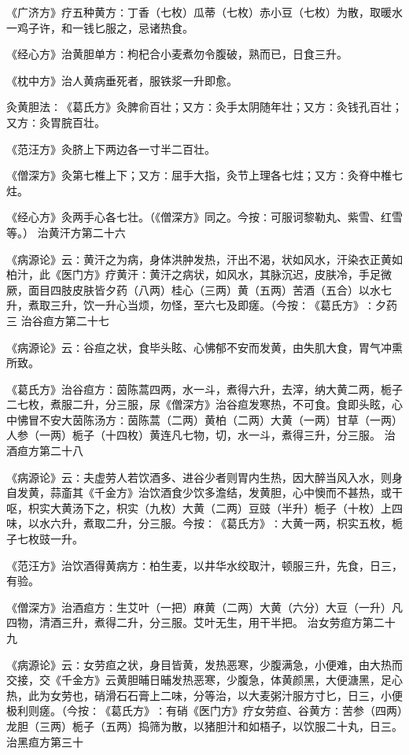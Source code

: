 \documentclass[a4paper,12pt,UTF8,twoside]{ctexbook}
\begin{document}
《广济方》疗五种黄方∶丁香（七枚）瓜蒂（七枚）赤小豆（七枚）为散，取暖水一鸡子许，和一钱匕服之，忌诸热食。

《经心方》治黄胆单方∶枸杞合小麦煮勿令腹破，熟而已，日食三升。

《枕中方》治人黄病垂死者，服铁浆一升即愈。

灸黄胆法∶《葛氏方》灸脾俞百壮；又方∶灸手太阴随年壮；又方∶灸钱孔百壮；又方∶灸胃脘百壮。

《范汪方》灸脐上下两边各一寸半二百壮。

《僧深方》灸第七椎上下；又方∶屈手大指，灸节上理各七炷；又方∶灸脊中椎七炷。

《经心方》灸两手心各七壮。（《僧深方》同之。今按∶可服诃黎勒丸、紫雪、红雪等。）
治黄汗方第二十六

《病源论》云∶黄汗之为病，身体洪肿发热，汗出不渴，状如风水，汗染衣正黄如柏汁，此《医门方》疗黄汗∶黄汗之病状，如风水，其脉沉迟，皮肤冷，手足微厥，面目四肢皮肤皆夕药（八两）桂心（三两）黄（五两）苦酒（五合）以水七升，煮取三升，饮一升心当烦，勿怪，至六七及即瘥。（今按∶《葛氏方》∶夕药三
治谷疸方第二十七

《病源论》云∶谷疸之状，食毕头眩、心怫郁不安而发黄，由失肌大食，胃气冲熏所致。

《葛氏方》治谷疸方∶茵陈蒿四两，水一斗，煮得六升，去滓，纳大黄二两，栀子二七枚，煮服二升，分三服，尿《僧深方》治谷疸发寒热，不可食。食即头眩，心中怫冒不安大茵陈汤方∶茵陈蒿（二两）黄柏（二两）大黄（一两）甘草（一两）人参（一两）栀子（十四枚）黄连凡七物，切，水一斗，煮得三升，分三服。
治酒疸方第二十八

《病源论》云∶夫虚劳人若饮酒多、进谷少者则胃内生热，因大醉当风入水，则身自发黄，蒜齑其《千金方》治饮酒食少饮多澹结，发黄胆，心中懊而不甚热，或干呕，枳实大黄汤下之，枳实（九枚）大黄（二两）豆豉（半升）栀子（十枚）上四味，以水六升，煮取二升，分三服。今按∶《葛氏方》∶大黄一两，枳实五枚，栀子七枚豉一升。

《范汪方》治饮酒得黄病方∶柏生麦，以井华水绞取汁，顿服三升，先食，日三，有验。

《僧深方》治酒疸方∶生艾叶（一把）麻黄（二两）大黄（六分）大豆（一升）凡四物，清酒三升，煮得二升，分三服。艾叶无生，用干半把。
治女劳疸方第二十九

《病源论》云∶女劳疸之状，身目皆黄，发热恶寒，少腹满急，小便难，由大热而交接，交《千金方》云黄胆晡日晡发热恶寒，少腹急，体黄颜黑，大便溏黑，足心热，此为女劳也，硝滑石石膏上二味，分等治，以大麦粥汁服方寸匕，日三，小便极利则瘥。（今按∶《葛氏方》∶有硝《医门方》疗女劳疸、谷黄方∶苦参（四两）龙胆（三两）栀子（五两）捣筛为散，以猪胆汁和如梧子，以饮服二十丸，日三。
治黑疸方第三十
\end{document}
